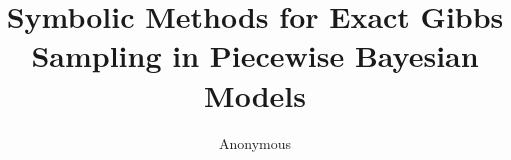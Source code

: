 \documentclass[letterpaper]{article}
\renewcommand{\-}{\text{-}}
\begin{document}
%
\title{Symbolic Methods for Exact Gibbs Sampling in Piecewise Bayesian Models}

%
%

\author{Anonymous}

\maketitle
\end{document}
